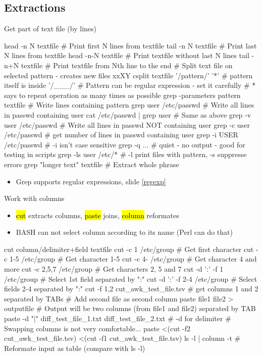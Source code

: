 \documentclass[compress, ucs, xelatex, 11pt, xcolor=svgnames,
  hyperref={
    bookmarks=true,
    unicode=true,
    colorlinks=true,
    pdftitle={Linux, command line and MetaCentrum},
    plainpages=false,
    pdfauthor={Vojtech Zeisek},
    pdfsubject={Course about use of Linux command line, writing shell scripts and using MetaCentrum of CESNET},
    pdfcreator={XeLaTeX},
    pdfkeywords={Linux, GNU, BASH, shell, command line, MetaCentrum},
    linkcolor=DarkRed,
    anchorcolor=DarkBlue,
    citecolor=Indigo,
    filecolor=NavyBlue,
    menucolor=DarkMagenta,
    urlcolor=DarkBlue,
    pdftex},
  url={hyphens, lowtilde} %
  ]{beamer}
\renewcommand{\texttt}[1]{\hl{\ttfamily #1}}
\begin{document}
\subsection{Extractions}

\begin{frame}[fragile]{Get part of text file (by lines)}
  \begin{bashcode}
    head -n N textfile # Print first N lines from textfile
    tail -n N textfile # Print last N lines from textfile
    head -n-N textfile # Print textfile without last N lines
    tail -n+N textfile # Print textfile from Nth line to the end
    # Split text file on selected pattern - creates new files xxXY
    csplit textfile '/pattern/' '{*}' # pattern itself is inside '/___/'
    # Pattern can be regular expression - set it carefully
    # {*} says to repeat operation as many times as possible
    grep -parameters pattern textfile # Write lines containing pattern
    grep user /etc/passwd # Write all lines in passwd containing user
    cat /etc/passwd | grep user # Same as above
    grep -v user /etc/passwd # Write all lines in passwd NOT containing user
    grep -c user /etc/passwd # get number of lines in passwd containing user
    grep -i USER /etc/passwd # -i isn't case sensitive
    grep -q ... # quiet - no output - good for testing in scripts
    grep -ls user /etc/* # -l print files with pattern, -s suppresse errors
    grep "longer text" textfile # Extract whole phrase
  \end{bashcode}
  \begin{itemize}
    \item Grep supports regular expressions, slide \ref{regexp}
  \end{itemize}
\end{frame}

\begin{frame}[fragile]{Work with columns}
  \begin{itemize}
    \item \texttt{cut} extracts columns, \texttt{paste} joins, \texttt{column} reformates
    \item BASH can not select column according to its name (Perl can do that)
  \end{itemize}
  \begin{bashcode}
    cut column/delimiter+field textfile
    cut -c 1 /etc/group # Get first character
    cut -c 1-5 /etc/group # Get character 1-5
    cut -c 4- /etc/group # Get character 4 and more
    cut -c 2,5,7 /etc/group # Get characters 2, 5 and 7
    cut -d ':' -f 1 /etc/group # Select 1st field separated by ":"
    cut -d ':' -f 2-4 /etc/group # Select fields 2-4 separated by ":"
    cut -f 1,2 cut_awk_test_file.tsv # get columns 1 and 2 separated by TABs
    # Add second file as second column
    paste file1 file2 > outputfile
    # Output will be two columns (from file1 and file2) separated by TAB
    paste -d "|" diff_test_file_1.txt diff_test_file_2.txt # -d for delimiter
    # Swapping columns is not very comfortable...
    paste <(cut -f2 cut_awk_test_file.tsv) <(cut -f1 cut_awk_test_file.tsv)
    ls -l | column -t # Reformate input as table (compare with ls -l)
  \end{bashcode}
  \vfill
\end{frame}
\end{document}
